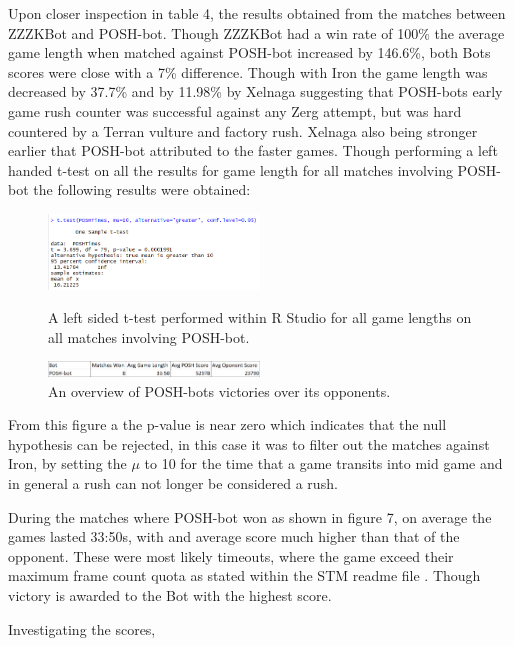 \documentclass[journal]{IEEEtran}
\begin{document}
Upon closer inspection in table 4, the results obtained from the matches between ZZZKBot and POSH-bot. Though ZZZKBot had a win rate of 100\% the average game length when matched against POSH-bot increased by 146.6\%, both Bots scores were close with a 7\% difference. Though with Iron the game length was decreased by 37.7\% and by 11.98\% by Xelnaga suggesting that POSH-bots early game rush counter was successful against any Zerg attempt, but was hard countered by a Terran vulture and factory rush. Xelnaga also being stronger earlier that POSH-bot attributed to the faster games. Though performing a left handed t-test on all the results for game length for all matches involving POSH-bot the following results were obtained:

\begin{figure}[H]
	\centering
	\includegraphics[width=0.5\textwidth]{RPoshTimeLeft}
	\caption{A left sided t-test performed within R Studio for all game lengths on all matches involving POSH-bot.}
	\label{Fig5}
	\centering
	\includegraphics[width=0.5\textwidth]{PoshWinsandScore}
	\caption{An overview of POSH-bots victories over its opponents.}
	\label{poshonly}
\end{figure}

From this figure a the p-value is near zero which indicates that the null hypothesis can be rejected, in this case it was to filter out the matches against Iron, by setting the $\mu$ to 10 for the time that a game transits into mid game and in general a rush can not longer be considered a rush. 

During the matches where POSH-bot won as shown in figure 7, on average the games lasted 33:50s, with and average score much higher than that of the opponent. These were most likely timeouts, where the game exceed their maximum frame count quota as stated within the STM readme file \cite{Tournament}. Though victory is awarded to the Bot with the highest score.

Investigating the scores, 
\end{document}
